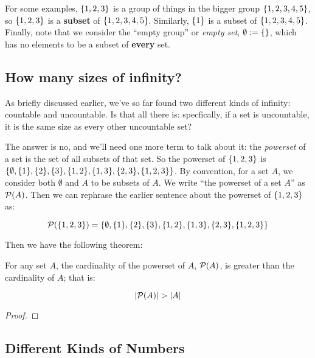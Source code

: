 For some examples, ${\left\{ {1,2,3} \right\}}$ is a group of things in the bigger group ${\left\{ {1,2,3,4,5} \right\}}$, so ${\left\{ {1,2,3} \right\}}$ is a \textbf{subset} of ${\left\{ {1,2,3,4,5} \right\}}$.
Similarly, ${\left\{ {1} \right\}}$ is a subset of ${\left\{ {1,2,3,4,5} \right\}}$.
Finally, note that we consider the ``empty group'' or \emph{empty set}, $\emptyset := {\left\{ {} \right\}}$, which has no elements to be a subset of \textbf{every} set.

\subsection{How many sizes of infinity?}

As briefly discussed earlier, we've so far found two different kinds of infinity: countable and uncountable.
Is that all there is: specfically, if a set is uncountable, it is the same size as every other uncountable set?

The answer is no, and we'll need one more term to talk about it: the \emph{powerset} of a set is the set of all subsets of that set.
So the powerset of ${\left\{ {1,2,3} \right\}}$ is ${\left\{ {\emptyset, {\left\{ {1} \right\}}, {\left\{ {2} \right\}}, {\left\{ {3} \right\}}, {\left\{ {1,2} \right\}}, {\left\{ {1,3} \right\}}, {\left\{ {2,3} \right\}}, {\left\{ {1,2,3} \right\}}} \right\}}$.
By convention, for a set $A$, we consider both $\emptyset$ and $A$ to be subsets of $A$.
We write ``the powerset of a set $A$'' as $\mathcal{P}{\left( {A} \right)}$.
Then we can rephrase the earlier sentence about the powerset of ${\left\{ {1,2,3} \right\}}$ as:

\[
    \mathcal{P}{\left( {{\left\{ {1,2,3} \right\}}} \right)} = {\left\{ {\emptyset, {\left\{ {1} \right\}}, {\left\{ {2} \right\}}, {\left\{ {3} \right\}}, {\left\{ {1,2} \right\}}, {\left\{ {1,3} \right\}}, {\left\{ {2,3} \right\}}, {\left\{ {1,2,3} \right\}}} \right\}}
\]

Then we have the following theorem:

\begin{theorem}
    For any set $A$, the cardinality of the powerset of $A$, $\mathcal{P}{\left( {A} \right)}$, is greater than the cardinality of $A$; that is:

    \[
        \left| \mathcal{P}{\left( {A} \right)} \right| > \left| A \right|
    \]
\end{theorem}

\begin{proof}

\end{proof}

\subsection{Different Kinds of Numbers}

